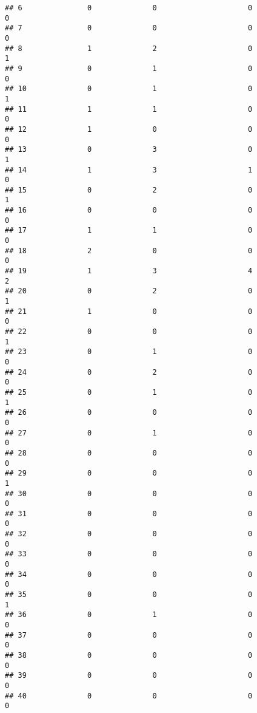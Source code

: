 \documentclass[
]{article}
\begin{document}
\begin{verbatim}
## 6               0              0                     0                 0
## 7               0              0                     0                 0
## 8               1              2                     0                 1
## 9               0              1                     0                 0
## 10              0              1                     0                 1
## 11              1              1                     0                 0
## 12              1              0                     0                 0
## 13              0              3                     0                 1
## 14              1              3                     1                 0
## 15              0              2                     0                 1
## 16              0              0                     0                 0
## 17              1              1                     0                 0
## 18              2              0                     0                 0
## 19              1              3                     4                 2
## 20              0              2                     0                 1
## 21              1              0                     0                 0
## 22              0              0                     0                 1
## 23              0              1                     0                 0
## 24              0              2                     0                 0
## 25              0              1                     0                 1
## 26              0              0                     0                 0
## 27              0              1                     0                 0
## 28              0              0                     0                 0
## 29              0              0                     0                 1
## 30              0              0                     0                 0
## 31              0              0                     0                 0
## 32              0              0                     0                 0
## 33              0              0                     0                 0
## 34              0              0                     0                 0
## 35              0              0                     0                 1
## 36              0              1                     0                 0
## 37              0              0                     0                 0
## 38              0              0                     0                 0
## 39              0              0                     0                 0
## 40              0              0                     0                 0

\end{verbatim}
\end{document}
